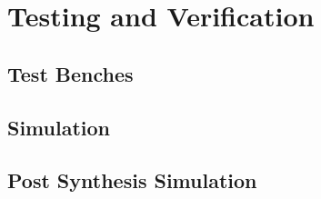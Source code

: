\chapter{Testing and Verification}

\section{Test Benches}
\section{Simulation}
\section{Post Synthesis Simulation}